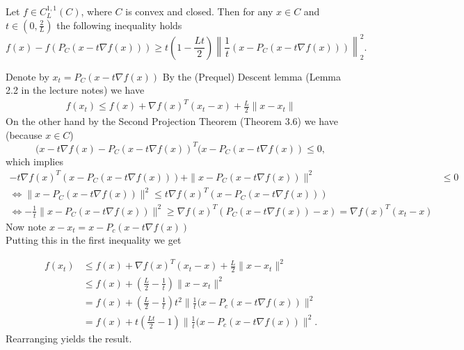\documentclass{ExerciseSheet}
\newif\ifsolutions
\begin{document}
\ifsolutions
\vskip 0.3cm
\begin{solution}
\end{solution}
\fi

\vskip 0.5cm
\begin{exo}

Let $f \in C_L^{1,1}(C)$, where $C$ is convex and closed. Then for any $x \in C$ and $t \in \left(0, \frac{2}{L}\right)$  the following inequality holds 
\begin{equation*}
    f(x) - f(P_C(x-t \nabla f (x))) \geq t \left(1 -  \frac{Lt}{2}\right) \left\|\frac{1}{t} (x-P_C(x-t \nabla f(x)))\right\|_2^2.
\end{equation*}
\end{exo}

\ifsolutions
\vskip 0.3cm

\begin{solution}
Denote by $x_t = P_C(x-t\nabla f(x))$
By the (Prequel) Descent lemma (Lemma 2.2 in the lecture notes) we have 
\begin{align*}
    f(x_t) \leq f(x) + \nabla f(x)^T(x_t - x) + \frac{L}{2} \|x-x_t\|
\end{align*}
On the other hand by the Second Projection Theorem (Theorem 3.6) we have (because $x\in C$)
\begin{equation*}
    (x-t\nabla f(x) - P_C(x-t\nabla f(x))^T(x-P_C(x-t \nabla f(x)) \leq 0,
\end{equation*}
which implies 
\begin{align*}
    -t\nabla f(x)^T(x-P_C(x-t\nabla f(x))) + \|x - P_C(x-t\nabla f(x))\|^2 &\leq  0 \\
    \Leftrightarrow \|x - P_C(x-t\nabla f(x))\|^2 \leq t\nabla f(x)^T(x-P_C(x-t\nabla f(x))) \\
    \Leftrightarrow -\frac{1}{t} \|x - P_C(x-t\nabla f(x))\|^2 \geq \nabla f(x)^T(P_C(x-t\nabla f(x))- x) = \nabla f(x)^T(x_t -x)
\end{align*}
Now note $x-x_t = x - P_c(x-t\nabla f(x))$ \\
Putting this in the first inequality we get

\begin{align*}
    f(x_t) &\leq f(x) + \nabla f(x)^T(x_t - x) + \frac{L}{2} \|x-x_t\|^2 \\
    & \leq  f(x) + \left(\frac{L}{2} - \frac{1}{t}\right) \|x-x_t\|^2  
    \\
    &= f(x) + \left(\frac{L}{2} - \frac{1}{t}\right) t^2 \|\frac{1}{t}(x- P_c(x-t\nabla f(x))\|^2  \\
    &= f(x) + t \left(\frac{Lt}{2} - 1\right) \|\frac{1}{t}(x- P_c(x-t\nabla f(x))\|^2  .
\end{align*}
Rearranging yields the result. 
\end{solution}
\end{document}
